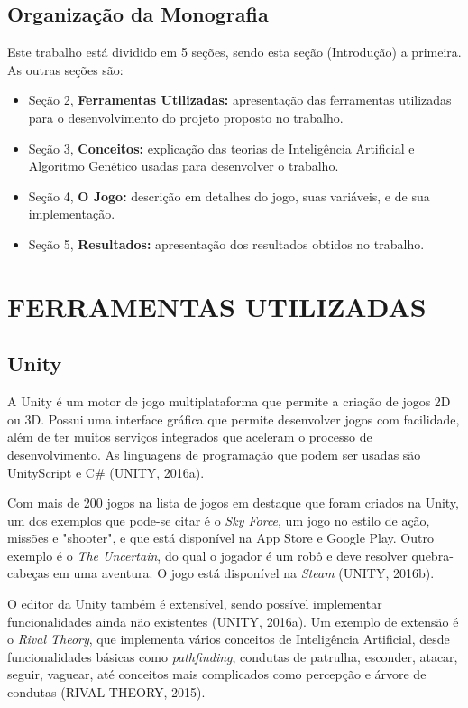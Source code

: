 \documentclass[12pt,a4paper]{article}
\begin{document}
	\FloatBarrier
	\subsection{Organização da Monografia}
		Este trabalho está dividido em 5 seções, sendo esta seção (Introdução) a primeira. As outras seções são:
		\begin{itemize}[noitemsep]
     		\item Seção 2, \textbf{Ferramentas Utilizadas:} apresentação das ferramentas utilizadas para o desenvolvimento do projeto proposto no trabalho.
     		\item Seção 3, \textbf{Conceitos:} explicação das teorias de Inteligência Artificial e Algoritmo Genético usadas para desenvolver o trabalho.
     		\item Seção 4, \textbf{O Jogo:} descrição em detalhes do jogo, suas variáveis, e de sua implementação.
     		\item Seção 5, \textbf{Resultados:} apresentação dos resultados obtidos no trabalho.
  	 	\end{itemize}

\FloatBarrier
\newpage %
\section{FERRAMENTAS UTILIZADAS}

	\FloatBarrier
	\subsection{Unity}
		A Unity é um motor de jogo multiplataforma que permite a criação de jogos 2D ou 3D.
		Possui uma interface gráfica que permite desenvolver jogos com facilidade,
		além de ter muitos serviços integrados que aceleram o processo de desenvolvimento.
		As linguagens de programação que podem ser usadas são UnityScript e C\#
		(UNITY, 2016a).
		
		Com mais de 200 jogos na lista de jogos em destaque que foram criados na Unity,
		um dos exemplos que pode-se citar é o \textit{Sky Force},
		um jogo no estilo de ação, missões e "shooter",
		e que está disponível na App Store e Google Play.
		Outro exemplo é o \textit{The Uncertain},
		do qual o jogador é um robô e
		deve resolver quebra-cabeças em uma aventura.
		O jogo está disponível na \textit{Steam}
		(UNITY, 2016b).
		
		O editor da Unity também é extensível, sendo possível implementar funcionalidades ainda não existentes
		(UNITY, 2016a).
		Um exemplo de extensão é o \textit{Rival Theory},
		que implementa vários conceitos de Inteligência Artificial,
		desde funcionalidades básicas como \textit{pathfinding},
		condutas de patrulha, esconder, atacar, seguir, vaguear,
		até conceitos mais complicados como percepção e árvore de condutas
		(RIVAL THEORY, 2015).
		
\end{document}
